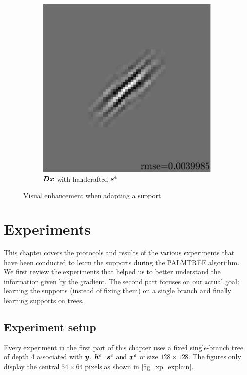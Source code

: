 \begin{figure}[!ht]
\begin{subfigure}[b]{0.085\textwidth}
	\caption{}
\end{subfigure}
\begin{subfigure}[b]{0.39\textwidth}\centering
	\includegraphics[width=\textwidth]{figures/exple-better-support/xp_128x128_sc2_angl1_K3_S3_node4expected_approx.pdf}
	\caption{$\bm{D}\bm{x}$ with handcrafted $\bm{s}^4$}\label{fig_xp_fixed_vs_expected_approx2}
\end{subfigure}
\caption{Visual enhancement when adapting a support.}\label{fig_xp_fixed_vs_expected}
\end{figure}




\chapter{Experiments}

This chapter covers the protocols and results of the various experiments that have been conducted to learn the supports during the \ac{PALMTREE} algorithm. We first review the experiments that helped us to better understand the information given by the gradient. The second part focuses on our actual goal: learning the supports (instead of fixing them) on a single branch and finally learning supports on trees.

\section{Experiment setup}
Every experiment in the first part of this chapter uses a fixed single-branch tree of depth 4 associated with $\bm{y}$, $\bm{h}^e$, $\bm{s}^e$ and $\bm{x}^e$ of size $128 \times 128$. The figures only display the central $64 \times 64$ pixels as shown in \cref{fig_xp_explain}.

